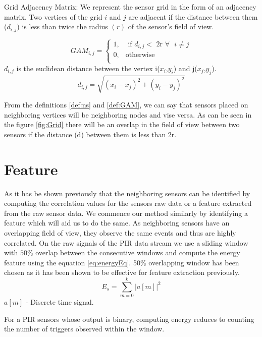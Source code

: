 \begin{definition}{Grid Adjacency Matrix:}
 We represent the sensor grid in the form of an adjacency matrix. Two vertices of the grid $i$ and $j$ are adjacent if the distance between them ($d_{i,j}$) is less than twice the radius $(r)$ of the sensor's field of view.

\[
GAM_{i,j} = 
\begin{cases}
1, &\text{ if } d_{i,j} < \text{  2r } \forall \text{ } i \ne j\\
0, & \text{otherwise}\\
\end{cases}
    \]
$d_{i,j}$  is the euclidean distance between the vertex i($x_i$,$y_i$) and j($x_j$,$y_j$).
\begin{equation*}
d_{i,j}=\sqrt{(x_i-x_j)^2 + (y_i-y_j)^2}
\end{equation*}
\label{def:GAM}
\end{definition}
From the definitions \ref{def:ns} and \ref{def:GAM}, we can say that sensors placed on neighboring vertices will be neighboring nodes and vise versa. As can be seen in the figure \ref{fig:Grid} there will be an overlap in the field of view between two sensors if the distance (d) between them is less than 2r.

\section{Feature}
As it has be shown previously\cite{Hong:2013:TAS:2528282.2528302,Koc:2014:CLC:2674061.2674075} that the neighboring sensors can be identified by computing the correlation values for the sensors raw data or a feature extracted from the raw sensor data. We commence our method similarly by identifying a feature which will aid us to do the same. As neighboring sensors have an overlapping field of view, they observe the same events and thus are highly correlated. On the raw signals of the PIR data stream we use a sliding window with $50\%$ overlap between the consecutive windows and compute the energy feature using the equation \ref{eq:energyEq}. 50\% overlapping window has been chosen as it has been shown to be effective for feature extraction previously\cite{bao2004activity}.
\begin{equation}
\label{eq:energyEq}
E_s = {\sum_{m=0}^{k}{|a[m]|}^2}
\end{equation}
$a[m]$ - Discrete time signal.

For a PIR sensors whose output is binary, computing energy reduces to counting the number of triggers observed within the window.

